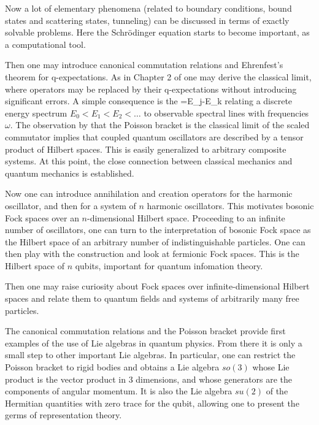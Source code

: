 \documentclass[12pt]{article}
\begin{document}
Now a lot of elementary phenomena (related to boundary conditions,
bound states and scattering states, tunneling) can be discussed in 
terms of exactly solvable problems. Here the Schr\"odinger equation 
starts to become important, as a computational tool. 

Then one may introduce canonical commutation relations and Ehrenfest's 
theorem for q-expectations. As in Chapter 2 of  
\cite{Neu.CQP} one may derive the classical limit, where operators may 
be replaced by their q-expectations without introducing significant 
errors. A simple consequence is the 
\hbar \omega=E_j-E_k
\eeq
relating a discrete energy spectrum $E_0<E_1<E_2<\ldots$ to observable 
spectral lines with frequencies $\omega$. The observation by 
 \cite{Dirac1925} that the Poisson bracket is the 
classical limit of the scaled commutator implies that coupled quantum 
oscillators are described by a tensor product of Hilbert spaces. 
This is easily generalized to arbitrary composite systems. At this 
point, the close connection between classical mechanics and quantum 
mechanics is established.

Now one can introduce annihilation and creation operators for the
harmonic oscillator, and then for a system of $n$ harmonic oscillators.
This motivates bosonic Fock spaces over an $n$-dimensional Hilbert 
space. Proceeding to an infinite number of oscillators, one can turn to 
the interpretation of bosonic Fock space as the Hilbert space of an
arbitrary number of indistinguishable particles.
One can then play with the construction and look at fermionic Fock
spaces. This is the Hilbert space of $n$ qubits, important for quantum
infomation theory.

Then one may raise curiosity about Fock spaces over
infinite-dimensional Hilbert spaces and relate them to quantum fields
and systems of arbitrarily many free particles.

The canonical commutation relations and the Poisson bracket provide 
first examples of the use of Lie algebras in quantum physics. From there
it is only a small step to other important Lie algebras. In particular,
one can restrict the Poisson bracket to rigid bodies and obtains a 
Lie algebra $so(3)$ whose Lie product is the vector product in 3 
dimensions, and whose generators are the components of angular momentum.
It is also the Lie algebra $su(2)$ of the Hermitian quantities with 
zero trace for the qubit, allowing one to present the germs of 
representation theory.
\end{document}
